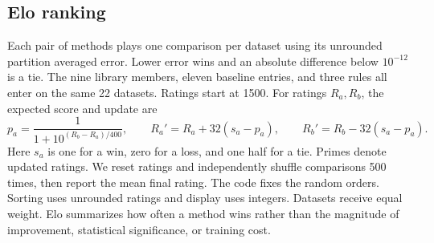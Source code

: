\subsection{Elo ranking}
\label{app:elo}
Each pair of methods plays one comparison per dataset using its unrounded
partition averaged error. Lower error wins and an absolute difference below
$10^{-12}$ is a tie. The nine library members, eleven baseline entries, and
three rules all enter on the same 22 datasets. Ratings start at 1500. For
ratings $R_a,R_b$, the expected score and update are
\begin{equation}
 p_a=\frac{1}{1+10^{(R_b-R_a)/400}},\qquad
 R_a'=R_a+32(s_a-p_a),\qquad R_b'=R_b-32(s_a-p_a).
\end{equation}
Here $s_a$ is one for a win, zero for a loss, and one half for a tie.
Primes denote updated ratings. We reset ratings and independently shuffle
comparisons 500 times, then report the mean final rating. The code fixes the
random orders. Sorting uses unrounded ratings and display uses integers.
Datasets receive equal weight. Elo summarizes how often a method wins rather
than the magnitude of improvement, statistical significance, or training cost.

